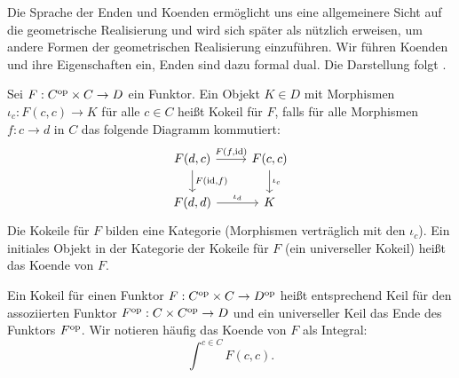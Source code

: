 Die Sprache der Enden und Koenden ermöglicht uns eine allgemeinere
Sicht auf die geometrische Realisierung und wird sich später als
nützlich erweisen, um andere Formen der geometrischen Realisierung
einzuführen. Wir führen Koenden und ihre Eigenschaften ein, Enden sind
dazu formal dual. Die Darstellung folgt \cite{Lore}.
\begin{defn}
  Sei $F: C^\mathrm{op} \times C \to D$ ein Funktor. Ein Objekt $K \in D$ mit
  Morphismen $\iota_c: F(c, c) \to K$ für alle $c \in C$ heißt Kokeil
  für $F$, falls für alle Morphismen $f: c \to d$ in $C$ das folgende
  Diagramm kommutiert:
  \[ \begin{tikzcd}
    F(d, c) \arrow{r}{F(f, \id)} \arrow{d}{F(\id, f)}
    & F(c, c) \arrow{d}{\iota_c} \\
    F(d, d) \arrow{r}{\iota_d} & K
  \end{tikzcd} \]
  Die Kokeile für $F$ bilden eine Kategorie (Morphismen verträglich
  mit den $\iota_c$). Ein initiales Objekt in der Kategorie der
  Kokeile für $F$ (ein universeller Kokeil) heißt das Koende von $F$.
\end{defn}
Ein Kokeil für einen Funktor $F: C^\mathrm{op} \times C \to D^\mathrm{op}$ heißt
entsprechend Keil für den assoziierten Funktor $F^\mathrm{op}: C \times C^\mathrm{op}
\to D$ und ein universeller Keil das Ende des Funktors $F^\mathrm{op}$. Wir
notieren häufig das Koende von $F$ als Integral:
\[ \int^{c \in C} F(c, c). \]

